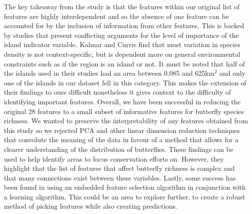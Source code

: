 \documentclass[prl,showpacs,superscriptaddress,twocolumn,longbibliography]{revtex4-1}
\begin{document}

The key takeaway from the study is that the features within our original list of features are highly interdependent and so the absence of one feature can be accounted for by the inclusion of information from other features. This is backed by studies that present conflicting arguments for the level of importance of the island indicator variable\cite{kalmar_unified_2007}. Kalmar and Currie find that most variation in species density is not context-specific, but is dependent more on general environmental constraints such as if the region is an island or not. It must be noted that half of the islands used in their studies had an area between 0.085 and 625km$^2$ and only one of the islands in our dataset fell in this category. This makes the extension of their findings to ours difficult nonetheless it gives context to the difficulty of identifying important features.
\newline
\newline
Overall, we have been successful in reducing the original 28 features to a small subset of informative features for butterfly species richness. We wanted to preserve the interpretability of any features obtained from this study so we rejected PCA and other linear dimension reduction techniques that convolute the meaning of the data in favour of a method that allows for a clearer understanding of the distribution of butterflies. These findings can be used to help identify areas to focus conservation efforts on. However, they highlight that the list of features that affect butterfly richness is complex and that many connections exist between these variables. Lastly, some success has been found in using an embedded feature selection algorithm in conjunction with a learning algorithm. This could be an area to explore further, to create a robust method of picking features while also creating predictions.




\end{document}
